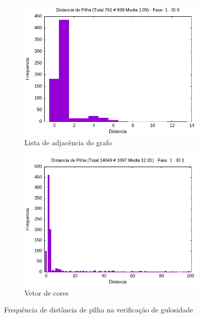 \documentclass{article}
\begin{document}
\begin{figure}[H]
    \centering
    \hfill
    \begin{subfigure}[c]{0.4\textwidth}
        \centering
        \includegraphics[width=\textwidth]{./images/100-200/common/registro_a-hist-1-0.png}
        \caption{Lista de adjacência do grafo}
        \label{fig:ac03}
    \end{subfigure}
    \hfill
    \begin{subfigure}[c]{0.4\textwidth}
        \centering
        \includegraphics[width=\textwidth]{./images/100-200/common/registro_a-hist-1-1.png}
        \caption{Vetor de cores}
        \label{fig:ac04}
    \end{subfigure}
    \hfill
    \caption{Frequência de distância de pilha na verificação de gulosidade}

\end{figure}
\end{document}
